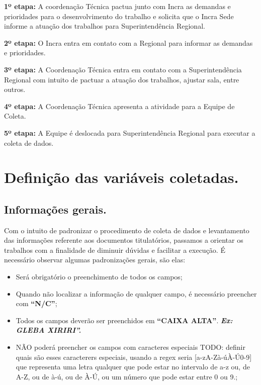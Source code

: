 \documentclass[
  letterpaper,
]{report}
\providecommand{\tightlist}{%
  \setlength{\itemsep}{0pt}\setlength{\parskip}{0pt}}\usepackage{longtable,booktabs,array}
\begin{document}
\textbf{1º etapa:} A coordenação Técnica pactua junto com Incra as
demandas e prioridades para o desenvolvimento do trabalho e solicita que
o Incra Sede informe a atuação dos trabalhos para Superintendência
Regional.

\textbf{2º etapa:} O Incra entra em contato com a Regional para informar
as demandas e prioridades.

\textbf{3º etapa:} A Coordenação Técnica entra em contato com a
Superintendência Regional com intuito de pactuar a atuação dos
trabalhos, ajustar sala, entre outros.

\textbf{4º etapa:} A Coordenação Técnica apresenta a atividade para a
Equipe de Coleta.

\textbf{5º etapa:} A Equipe é deslocada para Superintendência Regional
para executar a coleta de dados.


\hypertarget{definiuxe7uxe3o-das-variuxe1veis-coletadas.}{%
\chapter{Definição das variáveis
coletadas.}\label{definiuxe7uxe3o-das-variuxe1veis-coletadas.}}

\hypertarget{informauxe7uxf5es-gerais.}{%
\section{Informações gerais.}\label{informauxe7uxf5es-gerais.}}

Com o intuito de padronizar o procedimento de coleta de dados e
levantamento das informações referente aos documentos titulatórios,
passamos a orientar os trabalhos com a finalidade de diminuir dúvidas e
facilitar a execução. É necessário observar algumas padronizações
gerais, são elas:

\begin{itemize}
\tightlist
\item
  Será obrigatório o preenchimento de todos os campos;
\item
  Quando não localizar a informação de qualquer campo, é necessário
  preencher com \textbf{``N/C''};
\item
  Todos os campos deverão ser preenchidos em \textbf{``CAIXA ALTA''}.
  \emph{\textbf{Ex: GLEBA XIRIRI''.}}
\item
  NÃO poderá preencher os campos com caracteres especiais TODO: definir
  quais são esses caracterers especiais, usando a regex seria
  {[}a-zA-Zà-úÀ-Ú0-9{]} que representa uma letra qualquer que pode estar
  no intervalo de a-z ou, de A-Z, ou de à-ú, ou de À-Ú, ou um número que
  pode estar entre 0 ou 9.;
\end{itemize}
\end{document}

